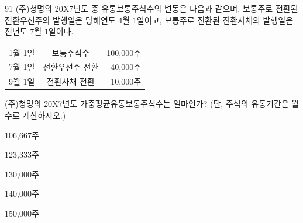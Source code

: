\begin{question}{91}
(주)청명의 20X7년도 중 유통보통주식수의 변동은 다음과 같으며, 보통주로 전환된 전환우선주의 발행일은 당해연도 4월 1일이고, 보통주로 전환된 전환사채의 발행일은 전년도 7월 1일이다.

{\small\centering
\begin{tabular}{lcr}
\hline
1월 1일 & 보통주식수 & 100,000주 \\
7월 1일 & 전환우선주 전환 & 40,000주 \\
9월 1일 & 전환사채 전환 & 10,000주 \\
\hline
\end{tabular}
\par}

(주)청명의 20X7년도 가중평균유통보통주식수는 얼마인가? (단, 주식의 유통기간은 월수로 계산하시오.) \par
\begin{choices}
  \item 106,667주
  \item 123,333주
  \item 130,000주
  \item 140,000주
  \item 150,000주
\end{choices}
\end{question}
\answerall
{}
